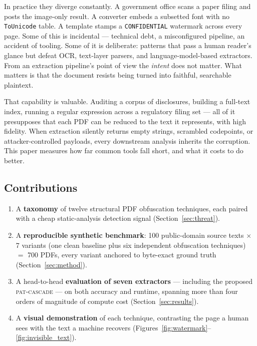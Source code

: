 \documentclass[11pt]{article}
\begin{document}
In practice they diverge constantly. A government office scans a paper
filing and posts the image-only result. A converter embeds a subsetted
font with no \texttt{ToUnicode} table. A template stamps a
\texttt{CONFIDENTIAL} watermark across every page. Some of this is
incidental --- technical debt, a misconfigured pipeline, an accident of
tooling. Some of it is deliberate: patterns that pass a human reader's
glance but defeat OCR, text-layer parsers, and language-model-based
extractors. From an extraction pipeline's point of view the
\emph{intent} does not matter. What matters is that the document
resists being turned into faithful, searchable plaintext.

That capability is valuable. Auditing a corpus of disclosures, building
a full-text index, running a regular expression across a regulatory
filing set --- all of it presupposes that each PDF can be reduced to the
text it represents, with high fidelity. When extraction silently returns
empty strings, scrambled codepoints, or attacker-controlled payloads,
every downstream analysis inherits the corruption. This paper measures
how far common tools fall short, and what it costs to do better.

\subsection{Contributions}

\begin{enumerate}[leftmargin=1.4em,itemsep=2pt]
  \item A \textbf{taxonomy} of twelve structural PDF obfuscation
    techniques, each paired with a cheap static-analysis detection
    signal (Section~\ref{sec:threat}).
  \item A \textbf{reproducible synthetic benchmark}: 100 public-domain
    source texts $\times$ 7 variants (one clean baseline plus six
    independent obfuscation techniques) $=$ 700 PDFs, every variant
    anchored to byte-exact ground truth (Section~\ref{sec:method}).
  \item A head-to-head \textbf{evaluation of seven extractors} ---
    including the proposed \textsc{pat-cascade} --- on both accuracy and
    runtime, spanning more than four orders of magnitude of compute cost
    (Section~\ref{sec:results}).
  \item A \textbf{visual demonstration} of each technique, contrasting
    the page a human sees with the text a machine recovers
    (Figures~\ref{fig:watermark}--\ref{fig:invisible_text}).
\end{enumerate}
\end{document}
